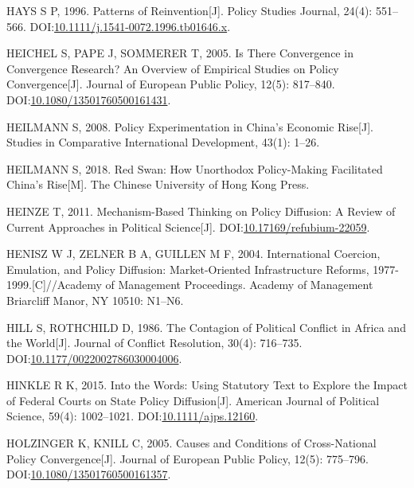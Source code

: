 \documentclass[
  12pt,
]{ctexart}
\newlength{\cslhangindent}
\newlength{\cslentryspacingunit} %
\newenvironment{CSLReferences}[2] %
 {%
  \setlength{\parindent}{0pt}
  \ifodd #1
  \let\oldpar\par
  \def\par{\hangindent=\cslhangindent\oldpar}
  \fi
  \setlength{\parskip}{#2\cslentryspacingunit}
 }%
 {}
\begin{document}
\begin{CSLReferences}{1}{0}
\leavevmode{}%
HAYS S P, 1996. Patterns of {Reinvention}{[}J{]}. Policy Studies Journal, 24(4): 551--566. DOI:\href{https://doi.org/10.1111/j.1541-0072.1996.tb01646.x}{10.1111/j.1541-0072.1996.tb01646.x}.

\leavevmode{}%
HEICHEL S, PAPE J, SOMMERER T, 2005. Is There Convergence in Convergence Research? An Overview of Empirical Studies on Policy Convergence{[}J{]}. Journal of European Public Policy, 12(5): 817--840. DOI:\href{https://doi.org/10.1080/13501760500161431}{10.1080/13501760500161431}.

\leavevmode{}%
HEILMANN S, 2008. Policy Experimentation in {China}'s Economic Rise{[}J{]}. Studies in Comparative International Development, 43(1): 1--26.

\leavevmode{}%
HEILMANN S, 2018. Red {Swan}: {How Unorthodox Policy-Making Facilitated China}'s {Rise}{[}M{]}. {The Chinese University of Hong Kong Press}.

\leavevmode{}%
HEINZE T, 2011. Mechanism-Based Thinking on Policy Diffusion: A Review of Current Approaches in Political Science{[}J{]}. DOI:\href{https://doi.org/10.17169/refubium-22059}{10.17169/refubium-22059}.

\leavevmode{}%
HENISZ W J, ZELNER B A, GUILLEN M F, 2004. International {Coercion}, {Emulation}, and {Policy Diffusion}: {Market-Oriented Infrastructure Reforms}, 1977-1999.{[}C{]}//Academy of {Management Proceedings}. {Academy of Management Briarcliff Manor, NY 10510}: N1--N6.

\leavevmode{}%
HILL S, ROTHCHILD D, 1986. The {Contagion} of {Political Conflict} in {Africa} and the {World}{[}J{]}. Journal of Conflict Resolution, 30(4): 716--735. DOI:\href{https://doi.org/10.1177/0022002786030004006}{10.1177/0022002786030004006}.

\leavevmode{}%
HINKLE R K, 2015. Into the {Words}: {Using Statutory Text} to {Explore} the {Impact} of {Federal Courts} on {State Policy Diffusion}{[}J{]}. American Journal of Political Science, 59(4): 1002--1021. DOI:\href{https://doi.org/10.1111/ajps.12160}{10.1111/ajps.12160}.

\leavevmode{}%
HOLZINGER K, KNILL C, 2005. Causes and Conditions of Cross-National Policy Convergence{[}J{]}. Journal of European Public Policy, 12(5): 775--796. DOI:\href{https://doi.org/10.1080/13501760500161357}{10.1080/13501760500161357}.


\end{CSLReferences}
\end{document}
